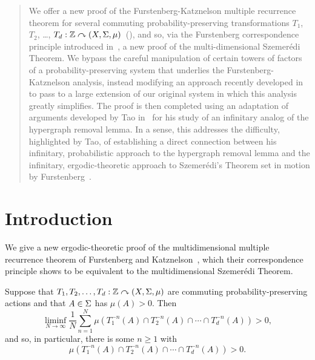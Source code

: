 \documentclass[12pt]{article}
\begin{document}
\begin{abstract}
We offer a new proof of the Furstenberg-Katznelson multiple
recurrence theorem for several commuting probability-preserving
transformations $T_1$, $T_2$, \ldots, $T_d:\bbZ\curvearrowright
(X,\S,\mu)$~(\cite{FurKat78}), and so, via the Furstenberg
correspondence principle introduced in~\cite{Fur77}, a new proof of
the multi-dimensional Szemer\'edi Theorem.  We bypass the careful
manipulation of certain towers of factors of a
probability-preserving system that underlies the
Furstenberg-Katznelson analysis, instead modifying an approach
recently developed in~\cite{Aus--nonconv} to pass to a large
extension of our original system in which this analysis greatly
simplifies. The proof is then completed using an adaptation of
arguments developed by Tao in~\cite{Tao07} for his study of an
infinitary analog of the hypergraph removal lemma. In a sense, this
addresses the difficulty, highlighted by Tao, of establishing a
direct connection between his infinitary, probabilistic approach to
the hypergraph removal lemma and the infinitary, ergodic-theoretic
approach to Szemer\'edi's Theorem set in motion by
Furstenberg~\cite{Fur77}.
\end{abstract}

\parskip 0pt

\tableofcontents

\parskip 7pt

\section{Introduction}

We give a new ergodic-theoretic proof of the multidimensional
multiple recurrence theorem of Furstenberg and
Katznelson~\cite{FurKat78}, which their correspondence principle
shows to be equivalent to the multidimensional Szemer\'edi Theorem.

\begin{thm}\label{thm:multirec}
Suppose that $T_1,T_2,\ldots,T_d:\bbZ\curvearrowright (X,\S,\mu)$
are commuting probability-preserving actions and that $A \in \S$ has
$\mu(A) > 0$. Then
\[\liminf_{N\to\infty}\frac{1}{N}\sum_{n=1}^N\mu(T_1^{-n}(A)\cap T_2^{-n}(A)\cap\cdots\cap T_d^{-n}(A)) > 0,\]
and so, in particular, there is some $n \geq 1$ with
\[\mu(T_1^{-n}(A)\cap T_2^{-n}(A)\cap\cdots\cap T_d^{-n}(A)) > 0.\]
\end{thm}
\end{document}
